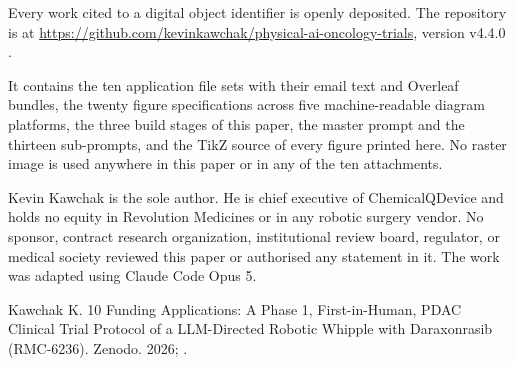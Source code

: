 
{\sloppy Every work cited to a digital object identifier is openly deposited.
The repository is at
\url{https://github.com/kevinkawchak/physical-ai-oncology-trials},
version v4.4.0 \cite{repo2026}.\par} It contains the ten application file sets with
their email text and Overleaf bundles, the twenty figure specifications across
five machine-readable diagram platforms, the three build stages of this paper,
the master prompt and the thirteen sub-prompts, and the TikZ source of every
figure printed here. No raster image is used anywhere in this paper or in any of
the ten attachments.


Kevin Kawchak is the sole author. He is chief executive of ChemicalQDevice and
holds no equity in Revolution Medicines or in any robotic surgery vendor. No
sponsor, contract research organization, institutional review board, regulator,
or medical society reviewed this paper or authorised any statement in it. The
work was adapted using Claude Code Opus 5.


Kawchak K. 10 Funding Applications: A Phase 1, First-in-Human, PDAC Clinical
Trial Protocol of a LLM-Directed Robotic Whipple with Daraxonrasib (RMC-6236).
Zenodo. 2026; .

\vspace{0.2em}
\apprule{0.5pt}
\vspace{-0.1em}

\vspace{-0.35em}
\begin{apprefs}


\end{apprefs}
